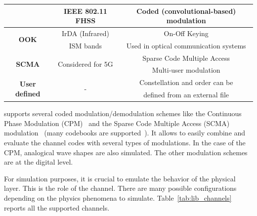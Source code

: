 \begin{table}
\begin{tabular}{ c | c | c }
                                         & IEEE 802.11 FHSS                   & Coded (convolutional-based) modulation    \\
  \hline
  \multirow{2}{*}{\textbf{OOK}}          & IrDA (Infrared)                    & On-Off Keying                             \\
                                         & ISM bands                          & Used in optical communication systems     \\
  \hline
  \multirow{2}{*}{\textbf{SCMA}}         & \multirow{2}{*}{Considered for 5G} & Sparse Code Multiple Access               \\
                                         &                                    & Multi-user modulation                     \\
  \hline
  \multirow{2}{*}{\textbf{User defined}} & \multirow{2}{*}{-}                 & Constellation and order can be            \\
                                         &                                    & defined from an external file             \\
  \end{tabular}
\end{table}

\AFFECT supports several coded modulation/demodulation schemes like the
Continuous Phase Modulation (CPM)~\cite{Aulin1981a,Aulin1981b} and the Sparse
Code Multiple Access (SCMA) modulation~\cite{Nikopour2013,Ghaffari2017,
Ghaffari2019} (many codebooks are supported~\cite{AlteraSCMA,Wu2015,Cheng2015,
Zhang2016,Klimentyev2016,Song2017,Klimentyev2017}). It allows to easily combine
and evaluate the channel codes with several types of modulations. In the case of
the CPM, analogical wave shapes are also simulated. The other modulation schemes
are at the digital level.

For simulation purposes, it is crucial to emulate the behavior of the physical
layer. This is the role of the channel. There are many possible configurations
depending on the physics phenomena to simulate.
Table~\ref{tab:lib_channels} reports all the supported channels.


